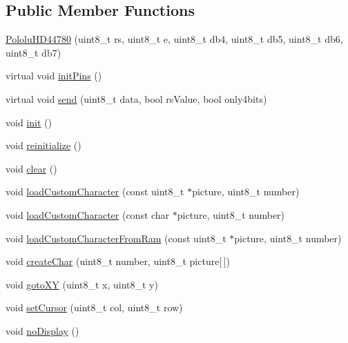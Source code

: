 \subsection*{Public Member Functions}
\begin{DoxyCompactItemize}
\item 
\hyperlink{class_pololu_h_d44780_aa435495f74686245db4f89a4d434b3ee}{Pololu\+H\+D44780} (uint8\+\_\+t rs, uint8\+\_\+t e, uint8\+\_\+t db4, uint8\+\_\+t db5, uint8\+\_\+t db6, uint8\+\_\+t db7)
\item 
virtual void \hyperlink{class_pololu_h_d44780_a876723b26f2dc081bf7f29019079489b}{init\+Pins} ()
\item 
virtual void \hyperlink{class_pololu_h_d44780_a8da2db526de9f1e2314cb02c3ba6121a}{send} (uint8\+\_\+t data, bool rs\+Value, bool only4bits)
\item 
void \hyperlink{class_pololu_h_d44780_base_a1c2a3edc8cfecde7e6fd2a83c17c0e23}{init} ()
\item 
void \hyperlink{class_pololu_h_d44780_base_a10c1c42406708172fc38b718790ba881}{reinitialize} ()
\item 
void \hyperlink{class_pololu_h_d44780_base_a4d35e9a47ceef1a7582e180165e0eae1}{clear} ()
\item 
void \hyperlink{class_pololu_h_d44780_base_a73d331af44ec2e624aa0468ce13f64e4}{load\+Custom\+Character} (const uint8\+\_\+t $\ast$picture, uint8\+\_\+t number)
\item 
void \hyperlink{class_pololu_h_d44780_base_a4f22d613433fce0e0c661a237ade9aeb}{load\+Custom\+Character} (const char $\ast$picture, uint8\+\_\+t number)
\item 
void \hyperlink{class_pololu_h_d44780_base_a72674b5466690b49b639ae2ec3e4983f}{load\+Custom\+Character\+From\+Ram} (const uint8\+\_\+t $\ast$picture, uint8\+\_\+t number)
\item 
void \hyperlink{class_pololu_h_d44780_base_afd802cdc57783830acfe2415355d9f09}{create\+Char} (uint8\+\_\+t number, uint8\+\_\+t picture\mbox{[}$\,$\mbox{]})
\item 
void \hyperlink{class_pololu_h_d44780_base_a4886df8c888669cf71675072689ace9b}{goto\+XY} (uint8\+\_\+t x, uint8\+\_\+t y)
\item 
void \hyperlink{class_pololu_h_d44780_base_aeb3377822dc672398a991f06a00312c0}{set\+Cursor} (uint8\+\_\+t col, uint8\+\_\+t row)
\item 
void \hyperlink{class_pololu_h_d44780_base_abc2d4e126017565c2a0cf2aac67870a0}{no\+Display} ()
\item 

\end{DoxyCompactItemize}
